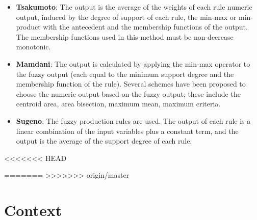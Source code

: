 \begin{itemize} 
\item \textbf{Tsakumoto}: The output is the average of the 
weights of each rule numeric output, induced by the degree of 
support of each rule, the min-max or min-product with the 
antecedent and the membership functions of the output. The 
membership functions used in this method must be 
non-decrease monotonic. 
\item \textbf{Mamdani}: The output is calculated by applying 
the min-max operator to the fuzzy output (each equal to the 
minimum support degree and the membership function of the rule). 
Several schemes have been proposed to choose the numeric output 
based on the fuzzy output; these include the centroid area, 
area bisection, maximum mean, maximum criteria.
\item \textbf{Sugeno}: The fuzzy production rules are used. The 
output of each rule is a linear combination of the input 
variables plus a constant term, and the output is the average 
of the support degree of each rule.
\end{itemize} 
<<<<<<< HEAD

=======
>>>>>>> origin/master
\section{Context}


